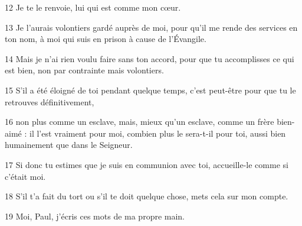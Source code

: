 
12 Je te le renvoie, lui qui est comme mon cœur.

13 Je l’aurais volontiers gardé auprès de moi, pour qu’il me rende des services en ton nom, à moi qui suis en prison à cause de l’Évangile.

14 Mais je n’ai rien voulu faire sans ton accord, pour que tu accomplisses ce qui est bien, non par contrainte mais volontiers.

15 S’il a été éloigné de toi pendant quelque temps, c’est peut-être pour que tu le retrouves définitivement,

16 non plus comme un esclave, mais, mieux qu’un esclave, comme un frère bien-aimé : il l’est vraiment pour moi, combien plus le sera-t-il pour toi, aussi bien humainement que dans le Seigneur.

17 Si donc tu estimes que je suis en communion avec toi, accueille-le comme si c’était moi.

18 S’il t’a fait du tort ou s’il te doit quelque chose, mets cela sur mon compte.

19 Moi, Paul, j’écris ces mots de ma propre main.